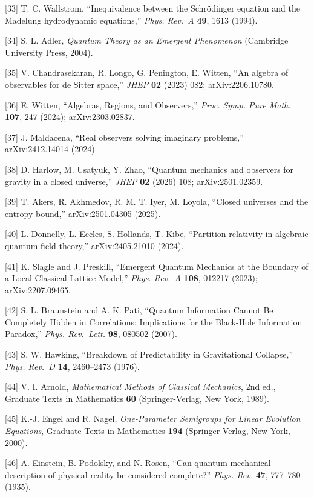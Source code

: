 \documentclass[
]{article}
\begin{document}
{[}33{]} T. C. Wallstrom, ``Inequivalence between the Schrödinger
equation and the Madelung hydrodynamic equations,'' \emph{Phys. Rev.~A}
\textbf{49}, 1613 (1994).

{[}34{]} S. L. Adler, \emph{Quantum Theory as an Emergent Phenomenon}
(Cambridge University Press, 2004).

{[}35{]} V. Chandrasekaran, R. Longo, G. Penington, E. Witten, ``An
algebra of observables for de Sitter space,'' \emph{JHEP} \textbf{02}
(2023) 082; arXiv:2206.10780.

{[}36{]} E. Witten, ``Algebras, Regions, and Observers,'' \emph{Proc.
Symp. Pure Math.} \textbf{107}, 247 (2024); arXiv:2303.02837.

{[}37{]} J. Maldacena, ``Real observers solving imaginary problems,''
arXiv:2412.14014 (2024).

{[}38{]} D. Harlow, M. Usatyuk, Y. Zhao, ``Quantum mechanics and
observers for gravity in a closed universe,'' \emph{JHEP} \textbf{02}
(2026) 108; arXiv:2501.02359.

{[}39{]} T. Akers, R. Akhmedov, R. M. T. Iyer, M. Loyola, ``Closed
universes and the entropy bound,'' arXiv:2501.04305 (2025).

{[}40{]} L. Donnelly, L. Eccles, S. Hollands, T. Kibe, ``Partition
relativity in algebraic quantum field theory,'' arXiv:2405.21010 (2024).

{[}41{]} K. Slagle and J. Preskill, ``Emergent Quantum Mechanics at the
Boundary of a Local Classical Lattice Model,'' \emph{Phys. Rev.~A}
\textbf{108}, 012217 (2023); arXiv:2207.09465.

{[}42{]} S. L. Braunstein and A. K. Pati, ``Quantum Information Cannot
Be Completely Hidden in Correlations: Implications for the Black-Hole
Information Paradox,'' \emph{Phys. Rev.~Lett.} \textbf{98}, 080502
(2007).

{[}43{]} S. W. Hawking, ``Breakdown of Predictability in Gravitational
Collapse,'' \emph{Phys. Rev.~D} \textbf{14}, 2460--2473 (1976).

{[}44{]} V. I. Arnold, \emph{Mathematical Methods of Classical
Mechanics}, 2nd ed., Graduate Texts in Mathematics \textbf{60}
(Springer-Verlag, New York, 1989).

{[}45{]} K.-J. Engel and R. Nagel, \emph{One-Parameter Semigroups for
Linear Evolution Equations}, Graduate Texts in Mathematics \textbf{194}
(Springer-Verlag, New York, 2000).

{[}46{]} A. Einstein, B. Podolsky, and N. Rosen, ``Can
quantum-mechanical description of physical reality be considered
complete?'' \emph{Phys. Rev.} \textbf{47}, 777--780 (1935).
\end{document}
